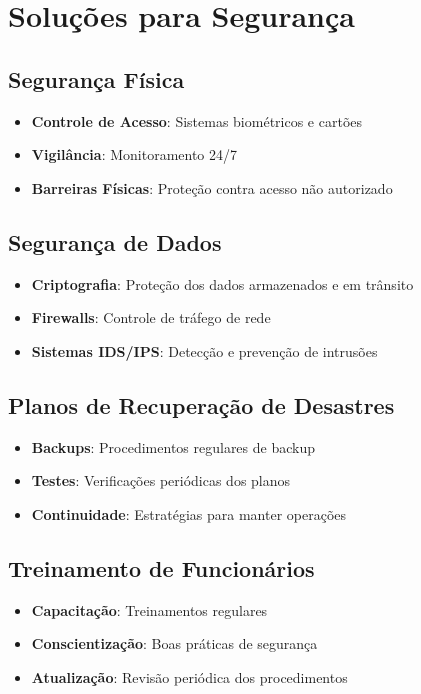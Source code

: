 \documentclass[
	12pt,				%
	oneside,			%
	a4paper,			%
	english,			%
	brazil				%
	]{abntex2unama}
\begin{document}
\chapter{Soluções para Segurança}

\section{Segurança Física}
\begin{itemize}
	\item \textbf{Controle de Acesso}: Sistemas biométricos e cartões
	\item \textbf{Vigilância}: Monitoramento 24/7
	\item \textbf{Barreiras Físicas}: Proteção contra acesso não autorizado
\end{itemize}

\section{Segurança de Dados}
\begin{itemize}
	\item \textbf{Criptografia}: Proteção dos dados armazenados e em trânsito
	\item \textbf{Firewalls}: Controle de tráfego de rede
	\item \textbf{Sistemas IDS/IPS}: Detecção e prevenção de intrusões
\end{itemize}

\section{Planos de Recuperação de Desastres}
\begin{itemize}
	\item \textbf{Backups}: Procedimentos regulares de backup
	\item \textbf{Testes}: Verificações periódicas dos planos
	\item \textbf{Continuidade}: Estratégias para manter operações
\end{itemize}

\section{Treinamento de Funcionários}
\begin{itemize}
	\item \textbf{Capacitação}: Treinamentos regulares
	\item \textbf{Conscientização}: Boas práticas de segurança
	\item \textbf{Atualização}: Revisão periódica dos procedimentos
\end{itemize}
\end{document}
